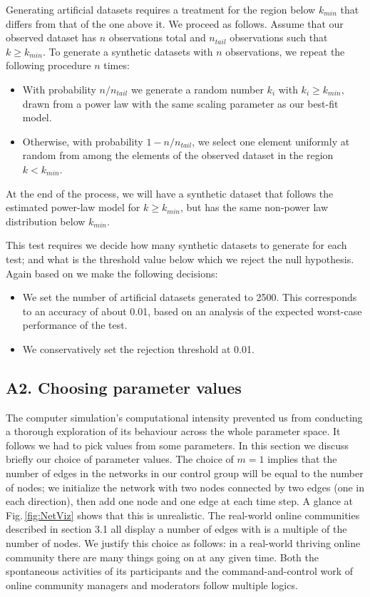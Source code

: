 \documentclass{nws}
\begin{document}
Generating artificial datasets requires a treatment for the region below $k_{min}$  that differs from that of the one above it. We proceed as follows. Assume that our observed dataset has $n$ observations total and $n_{tail}$ observations such that $k \geq k_{min}$. To generate a synthetic datasets with $n$ observations, we repeat the following procedure $n$ times:
\begin{itemize}
\item With probability $n/n_{tail}$ we generate a random number $k_i$ with $k_i \geq k_{min}$, drawn from a power law with the same scaling parameter as our best-fit model.
\item Otherwise, with probability $1 - n/n_{tail}$, we select one element uniformly at random from among the elements of the observed dataset in the region $k<k_{min}$.
\end{itemize}

At the end of the process, we will have a synthetic dataset that follows the estimated power-law model for $k \geq k_{min}$, but has the same non-power law distribution below $k_{min}$.

This test requires we decide how many synthetic datasets to generate for each test; and what is the threshold value below which we reject the null hypothesis. Again based on \cite{clauset2009power} we make the following decisions:

\begin{itemize}
\item We set the number of artificial datasets generated to 2500. This corresponds to an accuracy of about 0.01, based on an analysis of the expected worst-case performance of the test. 
\item We conservatively set the rejection threshold at 0.01.
\end{itemize}

\subsection*{A2. Choosing parameter values}

The computer simulation's computational intensity prevented us from conducting a thorough exploration of its behaviour across the whole parameter space. It follows we had to pick values from some parameters. In this section we discuss briefly our choice of parameter values.
The choice of $m=1$ implies that the number of edges in the networks in our control group will be equal to the number of nodes; we initialize the network with two nodes connected by two edges (one in each direction), then add one node and one edge at each time step. A glance at  Fig.\,\ref{fig:NetViz} shows that this is unrealistic. The real-world online communities described in section 3.1 all display a number of edges with is a multiple of the number of nodes. We justify this choice as follows: in a real-world thriving online community there are many things going on at any given time. Both the spontaneous activities of its participants and the command-and-control work of online community managers and moderators follow multiple logics. 
 
\end{document}
